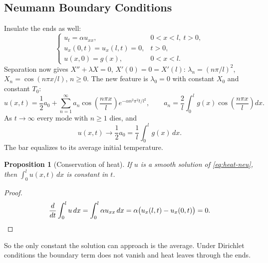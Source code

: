 \documentclass{article}
\newtheorem{proposition}{Proposition}
\begin{document}
\subsection{Neumann Boundary Conditions}
Insulate the ends as well:
\begin{equation}\label{eq:heat-neu}
    \begin{cases}
        u_t = \alpha u_{xx}, & 0 < x < l,\ t > 0, \\
        u_x(0,t) = u_x(l,t) = 0, & t > 0, \\
        u(x,0) = g(x), & 0 < x < l.
    \end{cases}
\end{equation}
Separation now gives $X'' + \lambda X = 0$, $X'(0) = 0 = X'(l)$: $\lambda_n = (n\pi/l)^2$, $X_n = \cos(n\pi x/l)$, $n \geq 0$. The new feature is $\lambda_0 = 0$ with constant $X_0$ and constant $T_0$:
\begin{equation}
    u(x,t) = \frac12a_0 + \sum_{n=1}^\infty a_n\cos\left(\frac{n\pi x}{l}\right)e^{-\alpha n^2\pi^2t/l^2}, \qquad a_n = \frac2l\int_0^l g(x)\cos\left(\frac{n\pi x}{l}\right)dx.
\end{equation}
As $t \to \infty$ every mode with $n \geq 1$ dies, and
\begin{equation}
    u(x,t) \to \frac12a_0 = \frac1l\int_0^l g(x)\,dx.
\end{equation}
The bar equalizes to its average initial temperature.
\begin{proposition}[Conservation of heat]
    If $u$ is a smooth solution of \eqref{eq:heat-neu}, then $\int_0^l u(x,t)\,dx$ is constant in $t$.
\end{proposition}
\begin{proof}
    \begin{equation}
        \frac{d}{dt}\int_0^l u\,dx = \int_0^l\alpha u_{xx}\,dx = \alpha\big(u_x(l,t) - u_x(0,t)\big) = 0. \qedhere
    \end{equation}
\end{proof}
So the only constant the solution can approach is the average. Under Dirichlet conditions the boundary term does not vanish and heat leaves through the ends.
\end{document}
